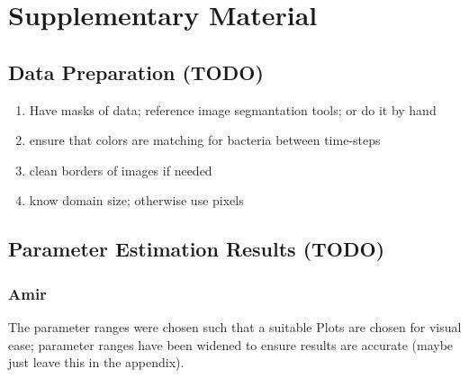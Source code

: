 \documentclass{article}
\begin{document}
\appendix
\renewcommand{\thesection}{}
\renewcommand{\thesubsection}{S\arabic{subsection}}
\section{Supplementary Material}

\subsection{Data Preparation (TODO)}
\begin{enumerate}
    \item Have masks of data; reference image segmantation tools; or do it by hand
    \item ensure that colors are matching for bacteria between time-steps
    \item clean borders of images if needed
    \item know domain size; otherwise use pixels
\end{enumerate}

\subsection{Parameter Estimation Results (TODO)}
\label{sec:supplement-parameter-profiles}

\subsubsection{Amir}
\label{subsec:supplement-parameter-profiles-amir}

The parameter ranges were chosen such that a suitable 
Plots are chosen for visual ease; parameter ranges have been widened to ensure results are
accurate (maybe just leave this in the appendix).
\end{document}
